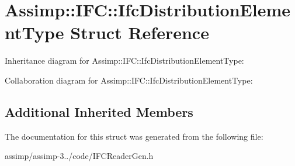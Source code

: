 \hypertarget{struct_assimp_1_1_i_f_c_1_1_ifc_distribution_element_type}{\section{Assimp\+:\+:I\+F\+C\+:\+:Ifc\+Distribution\+Element\+Type Struct Reference}
\label{struct_assimp_1_1_i_f_c_1_1_ifc_distribution_element_type}
}


Inheritance diagram for Assimp\+:\+:I\+F\+C\+:\+:Ifc\+Distribution\+Element\+Type\+:


Collaboration diagram for Assimp\+:\+:I\+F\+C\+:\+:Ifc\+Distribution\+Element\+Type\+:
\subsection*{Additional Inherited Members}


The documentation for this struct was generated from the following file\+:\begin{DoxyCompactItemize}
\item 
assimp/assimp-\/3../code/I\+F\+C\+Reader\+Gen.\+h\end{DoxyCompactItemize}
